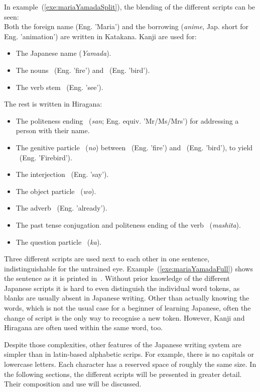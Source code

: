 In example~(\ref{exe:mariaYamadaSplit}), the blending of the different scripts 
can be seen:\\
Both the foreign name   (Eng. 'Maria') and the borrowing 
 (\emph{anime}, Jap. short for Eng. 'animation') are written in 
Katakana. Kanji are used for:
\begin{itemize}
\item The Japanese name  (\emph{Yamada}).
\item The nouns ~(Eng. 'fire') and 
      ~(Eng. 'bird').
\item The verb stem ~(Eng. 'see').
\end{itemize}
The rest is written in Hiragana:
\begin{itemize}
  \item The politeness ending ~(\emph{san}; 
        Eng. equiv. 'Mr/Ms/Mrs') for addressing a person with their name.
  \item The genitive particle ~(\emph{no}) between 
        ~(Eng. 'fire') and ~(Eng. 'bird'), to yield 
        ~(Eng. 'Firebird').
  \item The interjection ~(Eng. 'say').
  \item The object particle ~(\emph{wo}).
  \item The adverb ~(Eng. 'already').
  \item The past tense conjugation and politeness ending of the 
        verb ~(\emph{mashita}).
  \item The question particle ~(\emph{ka}).
\end{itemize}

Three different scripts are used next to each other in one sentence,
indistinguishable for the untrained eye. Example~(\ref{exe:mariaYamadaFull}) 
shows the sentence as it is printed in~. Without prior
knowledge of the different Japanese scripts it is hard to even distinguish
the individual word tokens, as blanks are usually absent in Japanese writing.
Other than actually knowing the words, which is not the usual case for a 
beginner of learning Japanese, often the change of script is the only way to 
recognise a new token. However, Kanji and Hiragana are often used within the same
word, too.

Despite those complexities, other features of the Japanese writing system are 
simpler than in latin-based alphabetic scrips. 
For example, there is no capitals or lowercase letters.
Each character has a reserved space of roughly the same size.
In the following sections, the different scripts will be presented in greater 
detail. Their composition and use will be discussed.

